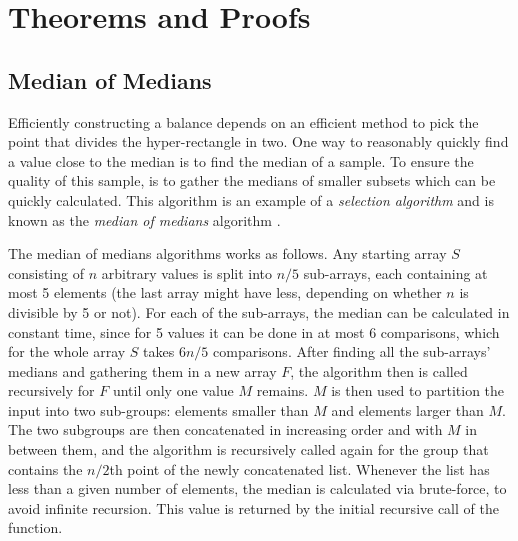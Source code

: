 \appendix
\chapter{Theorems and Proofs}
\label{chap:append}
\vspace{-15pt}

\section{Median of Medians}
\label{ann:median}
Efficiently constructing a balance \kdtree depends on an efficient method to pick the point that divides the hyper-rectangle in two. One way to reasonably quickly find a value close to the median is to find the median of a sample. To ensure the quality of this sample, is to gather the medians of smaller subsets which can be quickly calculated. This algorithm is an example of a \emph{selection algorithm} and is known as the \emph{median of medians} algorithm \cite{mediancomplex}.

The median of medians algorithms works as follows. Any starting array $S$ consisting of $n$ arbitrary values is split into $n/5$ sub-arrays, each containing at most 5 elements (the last array might have less, depending on whether $n$ is divisible by 5 or not). For each of the sub-arrays, the median can be calculated in constant time, since for 5 values it can be done in at most 6 comparisons, which for the whole array $S$ takes $6n/5$ comparisons. After finding all the sub-arrays' medians and gathering them in a new array $F$, the algorithm then is called recursively for $F$ until only one value $M$ remains. $M$ is then used to partition the input into two sub-groups: elements smaller than $M$ and elements larger than $M$. The two subgroups are then concatenated in increasing order and with $M$ in between them, and the algorithm is recursively called again for the group that contains the $n/2$th point of the newly concatenated list. Whenever the list has less than a given number of elements, the median is calculated via brute-force, to avoid infinite recursion. This value is returned by the initial recursive call of the function.

